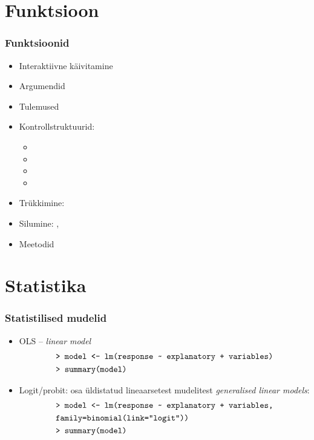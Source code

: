\documentclass[pdftex]{beamer}
\begin{document}
\section{Funktsioon}

\begin{frame}
  \frametitle{Funktsioonid}
  \begin{itemize}
  \item Interaktiivne käivitamine
  \item Argumendid
  \item Tulemused
    \pause
  \item Kontrollstruktuurid:
    \begin{itemize}
    \item {}
    \item {}
    \item {}
    \item {}
    \end{itemize}
    \pause
  \item Trükkimine: 
  \item Silumine: , 
  \item Meetodid
  \end{itemize}
\end{frame}



\section{Statistika}

\begin{frame}
  \frametitle{Statistilised mudelid}
  \begin{itemize}
  \item OLS -- \emph{linear model}
    \begin{align*}
      &\text{\texttt{> model <- lm(response \textasciitilde{} explanatory + variables)}}\\
      &\text{\texttt{> summary(model)}}
    \end{align*}
    \pause
  \item Logit/probit: osa üldistatud lineaarsetest mudelitest
    \emph{generalised linear models}:
    \begin{align*}
      &\text{\texttt{> model <- lm(response \textasciitilde{} explanatory + variables,}}\\
      &\text{\texttt{family=binomial(link="logit"))}}\\
      &\text{\texttt{> summary(model)}}
    \end{align*}
  \end{itemize}
\end{frame}
\end{document}
